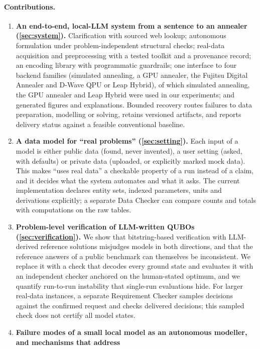 \paragraph{Contributions.}
\begin{enumerate}
  \item \textbf{An end-to-end, local-LLM system from a sentence to an annealer (\cref{sec:system}).}
        Clarification with sourced web lookup; autonomous formulation under problem-independent structural
        checks; real-data acquisition and preprocessing with a tested toolkit and a provenance record;
        an encoding library with programmatic guardrails; one interface to four backend families (simulated
        annealing, a GPU annealer, the Fujitsu Digital Annealer and D-Wave QPU or Leap Hybrid), of which
        simulated annealing, the GPU annealer and Leap Hybrid were used in our experiments; and generated figures and
        explanations. Bounded recovery routes failures to data preparation, modelling or solving, retains
        versioned artifacts, and reports delivery status against a feasible conventional baseline.
  \item \textbf{A data model for ``real problems'' (\cref{sec:setting}).} Each input of a model is either
        public data (found, never invented), a user setting (asked, with defaults) or private data (uploaded,
        or explicitly marked mock data). This makes ``uses real data'' a checkable property of a run instead of
        a claim, and it decides what the system automates and what it asks. The current implementation declares
        entity sets, indexed parameters, units and derivations explicitly; a separate Data Checker can compare
        counts and totals with computations on the raw tables.
  \item \textbf{Problem-level verification of LLM-written QUBOs (\cref{sec:verification}).} We show that
        bitstring-based verification with LLM-derived reference solutions misjudges models in both directions,
        and that the reference answers of a public benchmark can themselves be inconsistent. We replace it with
        a check that decodes every ground state and evaluates it with an independent checker anchored on the
        human-stated optimum, and we quantify run-to-run instability that single-run evaluations hide. For
        larger real-data instances, a separate Requirement Checker samples decisions against the confirmed
        request and checks delivered decisions; this sampled check does not certify all model states.
  \item \textbf{Failure modes of a small local model as an autonomous modeller, and mechanisms that address
}
\end{enumerate}
